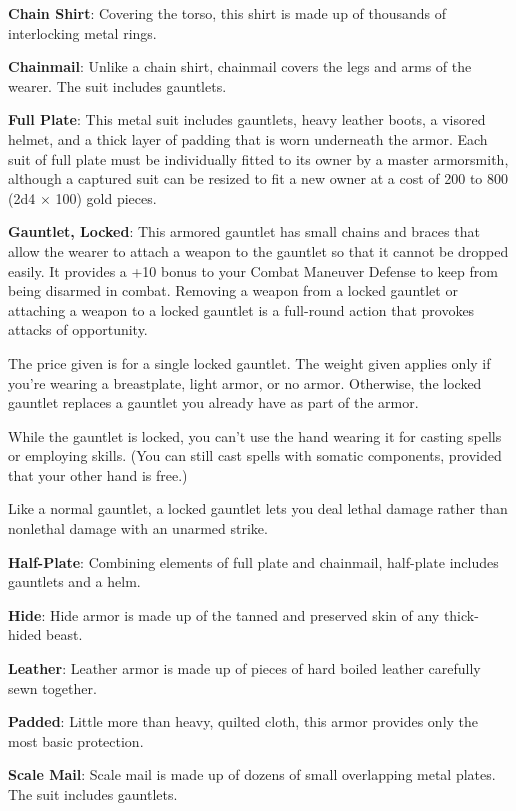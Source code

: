 \textbf{Chain Shirt}: Covering the torso, this shirt is made up of thousands of interlocking metal rings.
		
\textbf{Chainmail}: Unlike a chain shirt, chainmail covers the legs and arms of the wearer. The suit includes gauntlets.
		
\textbf{Full Plate}: This metal suit includes gauntlets, heavy leather boots, a visored helmet, and a thick layer of padding that is worn underneath the armor. Each suit of full plate must be individually fitted to its owner by a master armorsmith, although a captured suit can be resized to fit a new owner at a cost of 200 to 800 (2d4 \mbox{$\times$} 100) gold pieces.
		
\textbf{Gauntlet, Locked}: This armored gauntlet has small chains and braces that allow the wearer to attach a weapon to the gauntlet so that it cannot be dropped easily. It provides a +10 bonus to your Combat Maneuver Defense to keep from being disarmed in combat. Removing a weapon from a locked gauntlet or attaching a weapon to a locked gauntlet is a full-round action that provokes attacks of opportunity.
		
The price given is for a single locked gauntlet. The weight given applies only if you're wearing a breastplate, light armor, or no armor. Otherwise, the locked gauntlet replaces a gauntlet you already have as part of the armor.
		
While the gauntlet is locked, you can't use the hand wearing it for casting spells or employing skills. (You can still cast spells with somatic components, provided that your other hand is free.)
		
Like a normal gauntlet, a locked gauntlet lets you deal lethal damage rather than nonlethal damage with an unarmed strike.
		
\textbf{Half-Plate}: Combining elements of full plate and chainmail, half-plate includes gauntlets and a helm.
		
\textbf{Hide}: Hide armor is made up of the tanned and preserved skin of any thick-hided beast.
		
\textbf{Leather}: Leather armor is made up of pieces of hard boiled leather carefully sewn together.
		
\textbf{Padded}: Little more than heavy, quilted cloth, this armor provides only the most basic protection.
		
\textbf{Scale Mail}: Scale mail is made up of dozens of small overlapping metal plates. The suit includes gauntlets.
		
